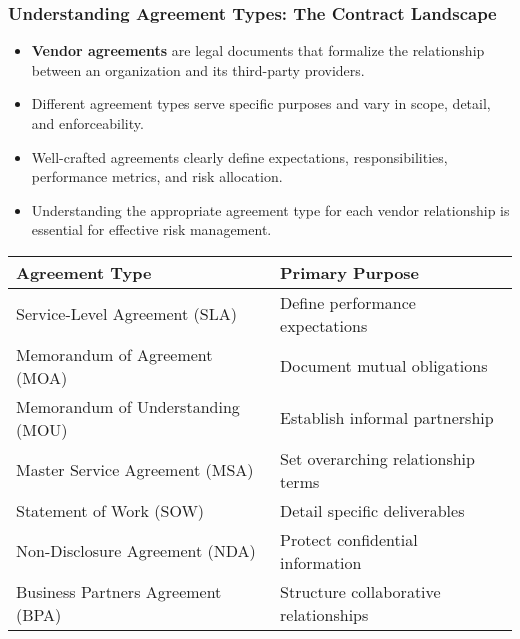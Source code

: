\documentclass{beamer}
\begin{document}
\begin{frame}
    \frametitle{Understanding Agreement Types: The Contract Landscape}
    
    \begin{itemize}
        \item \textbf{Vendor agreements} are legal documents that formalize the relationship between an organization and its third-party providers.
        \item Different agreement types serve specific purposes and vary in scope, detail, and enforceability.
        \item Well-crafted agreements clearly define expectations, responsibilities, performance metrics, and risk allocation.
        \item Understanding the appropriate agreement type for each vendor relationship is essential for effective risk management.
    \end{itemize}
    
    \begin{table}
        \scriptsize
        \centering
        \begin{tabular}{ll}
            \toprule
            \textbf{Agreement Type} & \textbf{Primary Purpose} \\
            \midrule
            Service-Level Agreement (SLA) & Define performance expectations \\
            Memorandum of Agreement (MOA) & Document mutual obligations \\
            Memorandum of Understanding (MOU) & Establish informal partnership \\
            Master Service Agreement (MSA) & Set overarching relationship terms \\
            Statement of Work (SOW) & Detail specific deliverables \\
            Non-Disclosure Agreement (NDA) & Protect confidential information \\
            Business Partners Agreement (BPA) & Structure collaborative relationships \\
            \bottomrule
        \end{tabular}
    \end{table}
\end{frame}
\end{document}
